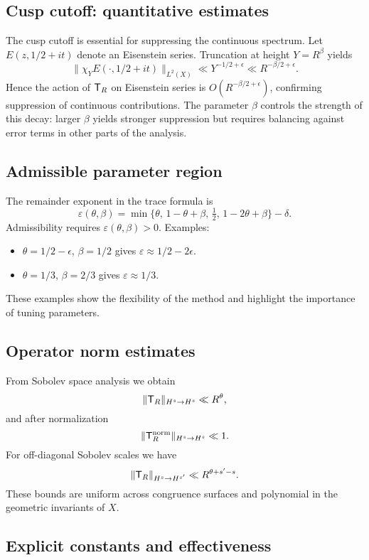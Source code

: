 \subsection{Cusp cutoff: quantitative estimates}\label{subsec:proj-cusp-detail}

The cusp cutoff is essential for suppressing the continuous spectrum. Let $E(z,1/2+it)$ denote an Eisenstein series. Truncation at height $Y=R^\beta$ yields
\[
\|\chi_Y E(\cdot,1/2+it)\|_{L^2(X)} \ll Y^{-1/2+\epsilon} \ll R^{-\beta/2+\epsilon}.
\]
Hence the action of $\mathsf{T}_R$ on Eisenstein series is $O(R^{-\beta/2+\epsilon})$, confirming suppression of continuous contributions. The parameter $\beta$ controls the strength of this decay: larger $\beta$ yields stronger suppression but requires balancing against error terms in other parts of the analysis.

\subsection{Admissible parameter region}\label{subsec:proj-parameters}

The remainder exponent in the trace formula is
\[
\varepsilon(\theta,\beta) = \min\{\theta,\,1-\theta+\beta,\,\tfrac12,\,1-2\theta+\beta\}-\delta.
\]
Admissibility requires $\varepsilon(\theta,\beta)>0$. Examples:
\begin{itemize}
\item $\theta=1/2-\epsilon$, $\beta=1/2$ gives $\varepsilon\approx 1/2-2\epsilon$.
\item $\theta=1/3$, $\beta=2/3$ gives $\varepsilon\approx 1/3$.
\end{itemize}
These examples show the flexibility of the method and highlight the importance of tuning parameters.

\subsection{Operator norm estimates}\label{subsec:proj-opnorm}

From Sobolev space analysis we obtain
\[
\|\mathsf{T}_R\|_{H^s\to H^s} \ll R^\theta,
\]
and after normalization
\[
\|\mathsf{T}_R^{\mathrm{norm}}\|_{H^s\to H^s} \ll 1.
\]
For off-diagonal Sobolev scales we have
\[
\|\mathsf{T}_R\|_{H^s\to H^{s'}} \ll R^{\theta+s'-s}.
\]
These bounds are uniform across congruence surfaces and polynomial in the geometric invariants of $X$.

\subsection{Explicit constants and effectiveness}\label{subsec:proj-constants}

